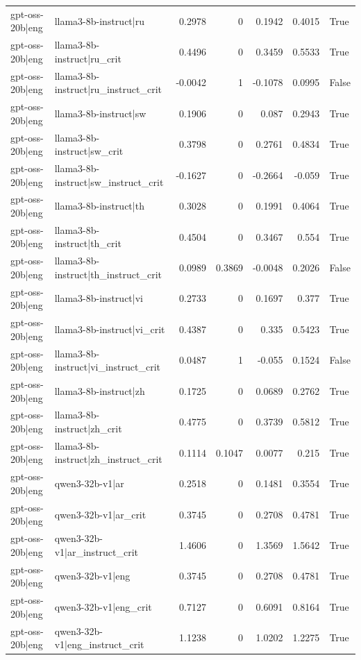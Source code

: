 \begin{table}
\begin{tabular}{l l r r r r l}
gpt-oss-20b|eng & llama3-8b-instruct|ru & 0.2978 & 0 & 0.1942 & 0.4015 & True \\
gpt-oss-20b|eng & llama3-8b-instruct|ru_crit & 0.4496 & 0 & 0.3459 & 0.5533 & True \\
gpt-oss-20b|eng & llama3-8b-instruct|ru_instruct_crit & -0.0042 & 1 & -0.1078 & 0.0995 & False \\
gpt-oss-20b|eng & llama3-8b-instruct|sw & 0.1906 & 0 & 0.087 & 0.2943 & True \\
gpt-oss-20b|eng & llama3-8b-instruct|sw_crit & 0.3798 & 0 & 0.2761 & 0.4834 & True \\
gpt-oss-20b|eng & llama3-8b-instruct|sw_instruct_crit & -0.1627 & 0 & -0.2664 & -0.059 & True \\
gpt-oss-20b|eng & llama3-8b-instruct|th & 0.3028 & 0 & 0.1991 & 0.4064 & True \\
gpt-oss-20b|eng & llama3-8b-instruct|th_crit & 0.4504 & 0 & 0.3467 & 0.554 & True \\
gpt-oss-20b|eng & llama3-8b-instruct|th_instruct_crit & 0.0989 & 0.3869 & -0.0048 & 0.2026 & False \\
gpt-oss-20b|eng & llama3-8b-instruct|vi & 0.2733 & 0 & 0.1697 & 0.377 & True \\
gpt-oss-20b|eng & llama3-8b-instruct|vi_crit & 0.4387 & 0 & 0.335 & 0.5423 & True \\
gpt-oss-20b|eng & llama3-8b-instruct|vi_instruct_crit & 0.0487 & 1 & -0.055 & 0.1524 & False \\
gpt-oss-20b|eng & llama3-8b-instruct|zh & 0.1725 & 0 & 0.0689 & 0.2762 & True \\
gpt-oss-20b|eng & llama3-8b-instruct|zh_crit & 0.4775 & 0 & 0.3739 & 0.5812 & True \\
gpt-oss-20b|eng & llama3-8b-instruct|zh_instruct_crit & 0.1114 & 0.1047 & 0.0077 & 0.215 & True \\
gpt-oss-20b|eng & qwen3-32b-v1|ar & 0.2518 & 0 & 0.1481 & 0.3554 & True \\
gpt-oss-20b|eng & qwen3-32b-v1|ar_crit & 0.3745 & 0 & 0.2708 & 0.4781 & True \\
gpt-oss-20b|eng & qwen3-32b-v1|ar_instruct_crit & 1.4606 & 0 & 1.3569 & 1.5642 & True \\
gpt-oss-20b|eng & qwen3-32b-v1|eng & 0.3745 & 0 & 0.2708 & 0.4781 & True \\
gpt-oss-20b|eng & qwen3-32b-v1|eng_crit & 0.7127 & 0 & 0.6091 & 0.8164 & True \\
gpt-oss-20b|eng & qwen3-32b-v1|eng_instruct_crit & 1.1238 & 0 & 1.0202 & 1.2275 & True \\

\end{tabular}
\end{table}
